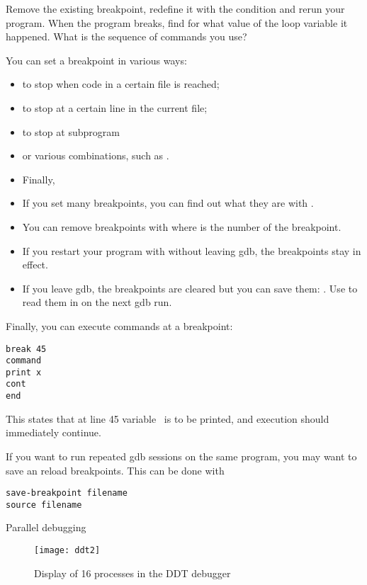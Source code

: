 Remove the existing breakpoint, redefine it with the condition 
and rerun your program. When the program breaks, find for what value
of the loop variable it happened. What is the sequence of commands you use?

You can set a breakpoint in various ways:
\begin{itemize}
\item {} to stop when code in a certain file is reached;
\item {} to stop at a certain line in the current file;
\item {} to stop at subprogram 
\item or various combinations, such as .
\item Finally, 
\end{itemize}

\begin{itemize}
\item If you set many breakpoints, you can find out what they are with
  . 
\item You can remove breakpoints with  where  is the
  number of the breakpoint.
\item If you restart your program with  without leaving gdb,
  the breakpoints stay in effect.
\item If you leave gdb, the breakpoints are cleared but you can save
  them: . Use  to read
  them in on the next gdb run.
\end{itemize}

Finally, you can execute commands at a breakpoint:
\begin{verbatim}
break 45
command
print x
cont
end
\end{verbatim}
This states that at line 45 variable~ is to be printed, and execution
should immediately continue.

If you want to run repeated gdb sessions on the same program,
you may want to save an reload breakpoints. This can be done with
\begin{verbatim}
save-breakpoint filename
source filename
\end{verbatim}


 {Parallel debugging}

\begin{figure}[ht]
\texttt{[image: ddt2]}
\caption{Display of 16 processes in the DDT debugger}
\label{fig:ddt2}
\end{figure}

